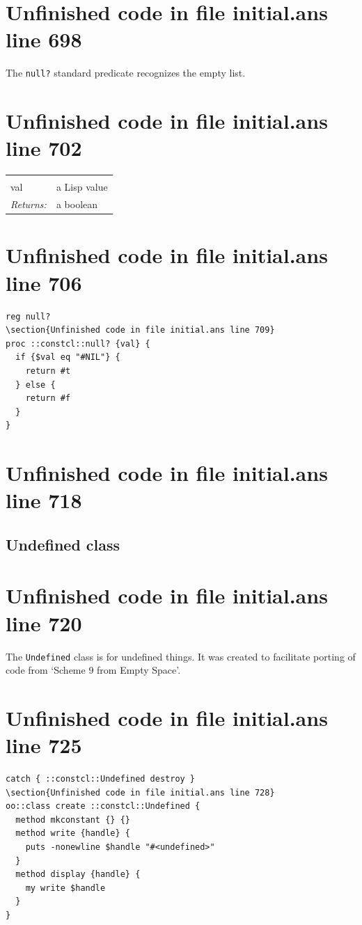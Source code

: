 \documentclass[twoside,9pt]{report}
\begin{document}
\section{Unfinished code in file initial.ans line 698}


The \texttt{null?} standard predicate recognizes the empty list.

\section{Unfinished code in file initial.ans line 702}
\noindent\begin{tabular}{ |p{1.9cm} p{8cm}| }
\hline
\rowcolor[HTML]{CCCCCC} \multicolumn{2}{|l|}{\bf null? (public)} \\
val & a Lisp value \\
\textit{Returns:} & a boolean \\
\hline
\end{tabular}
\section{Unfinished code in file initial.ans line 706}
\begin{lstlisting}
reg null?
\section{Unfinished code in file initial.ans line 709}
proc ::constcl::null? {val} {
  if {$val eq "#NIL"} {
    return #t
  } else {
    return #f
  }
}
\end{lstlisting}
\section{Unfinished code in file initial.ans line 718}
\subsection{Undefined class}
\label{undefined-class}
\section{Unfinished code in file initial.ans line 720}


The \texttt{Undefined} class is for undefined things. It was created to facilitate porting of code from `Scheme 9 from Empty Space'.

\section{Unfinished code in file initial.ans line 725}
\begin{lstlisting}
catch { ::constcl::Undefined destroy }
\section{Unfinished code in file initial.ans line 728}
oo::class create ::constcl::Undefined {
  method mkconstant {} {}
  method write {handle} {
    puts -nonewline $handle "#<undefined>"
  }
  method display {handle} {
    my write $handle
  }
}
\end{lstlisting}
\end{document}
